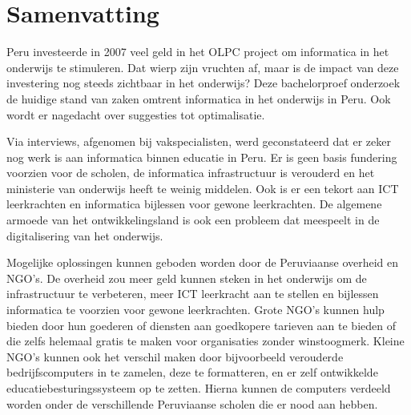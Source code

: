 
%
%

%

\chapter*{Samenvatting}
\label{ch:samenvatting}
Peru investeerde in 2007 veel geld in het OLPC project om informatica in het onderwijs te stimuleren. Dat wierp zijn vruchten af, maar is de impact van deze investering nog steeds zichtbaar in het onderwijs? Deze bachelorproef onderzoek de huidige stand van zaken omtrent informatica in het onderwijs in Peru. Ook wordt er nagedacht over suggesties tot optimalisatie. 

Via interviews, afgenomen bij vakspecialisten, werd geconstateerd dat er zeker nog werk is aan informatica binnen educatie in Peru. Er is geen basis fundering voorzien voor de scholen, de informatica infrastructuur is verouderd en het ministerie van onderwijs heeft te weinig middelen. Ook is er een tekort aan ICT leerkrachten en informatica bijlessen voor gewone leerkrachten. De algemene armoede van het ontwikkelingsland is ook een probleem dat meespeelt in de digitalisering van het onderwijs. 

Mogelijke oplossingen kunnen geboden worden door de Peruviaanse overheid en NGO's. De overheid zou meer geld kunnen steken in het onderwijs om de infrastructuur te verbeteren, meer ICT leerkracht aan te stellen en bijlessen informatica te voorzien voor gewone leerkrachten. Grote NGO's kunnen hulp bieden door hun goederen of diensten aan goedkopere tarieven aan te bieden of die zelfs helemaal gratis te maken voor organisaties zonder winstoogmerk. Kleine NGO's kunnen ook het verschil maken door bijvoorbeeld verouderde bedrijfscomputers in te zamelen, deze te formatteren, en er zelf ontwikkelde educatiebesturingssysteem op te zetten. Hierna kunnen de computers verdeeld worden onder de verschillende Peruviaanse scholen die er nood aan hebben. 

